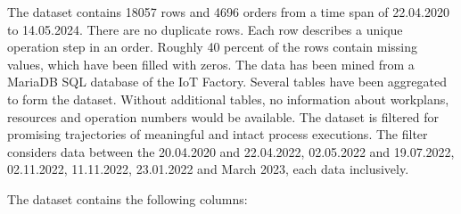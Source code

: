 The dataset contains 18057 rows and 4696 orders from a time span of 22.04.2020 to 14.05.2024. There are no duplicate rows. Each row describes a unique operation step in an order. Roughly 40 percent of the rows contain missing values, which have been filled with zeros. The data has been mined from a MariaDB SQL database of the IoT Factory. Several tables have been aggregated to form the dataset. Without additional tables, no information about workplans, resources and operation numbers would be available. The dataset is filtered for promising trajectories of meaningful and intact process executions. The filter considers data between the 20.04.2020 and 22.04.2022, 02.05.2022 and 19.07.2022, 02.11.2022, 11.11.2022, 23.01.2022 and March 2023, each data inclusively.

The dataset contains the following columns:

